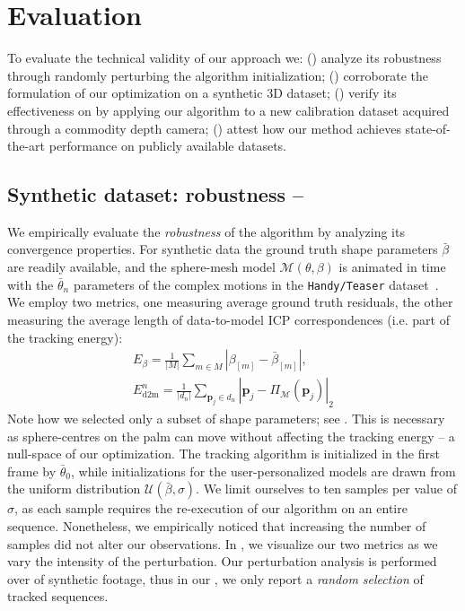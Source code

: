 \section{Evaluation}
To evaluate the technical validity of our approach we:
() analyze its robustness through randomly perturbing the algorithm initialization; 
() corroborate the formulation of our optimization on a synthetic 3D dataset;
() verify its effectiveness on by applying our algorithm to a new calibration dataset acquired through a commodity depth camera; 
() attest how our method achieves state-of-the-art performance on publicly available datasets.

\subsection{Synthetic dataset: robustness -- }
\label{sec:evalsynth}
We empirically evaluate the \emph{robustness} of the algorithm by analyzing its convergence properties. 
For synthetic data the ground truth shape parameters $\bar\beta$ are readily available, and the sphere-mesh model $\mathcal{M}(\theta,\beta)$ is animated in time with the $\bar\theta_n$ parameters of the complex motions in the \texttt{Handy/Teaser} dataset~\cite{tkach2016sphere}.
We employ two metrics, one measuring average ground truth residuals, the other measuring the average length of data-to-model ICP correspondences (i.e. part of the tracking energy):
% 
\begin{align}
E_{\beta} = \tfrac{1}{|M|} \sum_{m \in M} \left| \beta_{[m]} - \bar\beta_{[m]} \right|, 
\\
E_\text{d2m}^n = \tfrac{1}{|d_n|} \sum_{\mathbf{p}_j \in d_n} \left| \mathbf{p}_j - \Pi_{\mathcal{M}}(\mathbf{p}_j) \right|_2
\label{eq:metrics}
\end{align}
% 
Note how we selected only a subset  of shape parameters; see . This is necessary as sphere-centres on the palm can move without affecting the tracking energy -- a null-space of our optimization.
% 
The tracking algorithm is initialized in the first frame by $\bar\theta_0$, while initializations for the user-personalized models are drawn from the uniform distribution {\small $\mathcal{U}(\bar\beta, \sigma)$}.
We limit ourselves to ten samples per value of $\sigma$, as each sample requires the re-execution of our algorithm on an entire sequence. Nonetheless, we empirically noticed that increasing the number of samples did not alter our observations.
In , we visualize our two metrics as we vary the intensity of the perturbation. Our perturbation analysis is performed over  of synthetic footage, thus in our \VideoSynth{}, we only report a \emph{random selection} of tracked sequences.
% 

